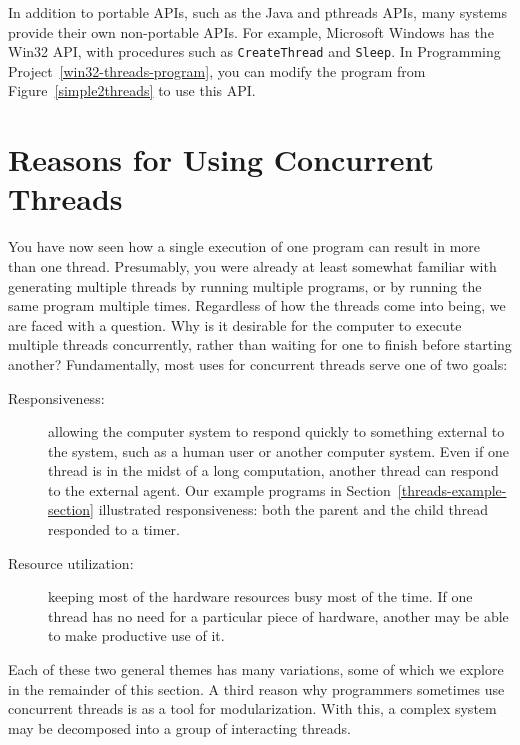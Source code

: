 In addition to portable APIs, such as the Java and pthreads APIs, many
systems provide their own non-portable APIs.  For example, Microsoft
Windows has the Win32 API, with procedures such as \verb|CreateThread|
and \verb|Sleep|.  In Programming Project~\ref{win32-threads-program}, you can modify the
program from Figure~\ref{simple2threads} to use this API.

\section{Reasons for Using Concurrent Threads}\label{threads-uses-section}
You have now seen how a single execution of one program can result in
more than one thread.  Presumably, you were already at least somewhat
familiar with generating multiple threads by running multiple
programs, or by running the same program multiple times.  Regardless
of how the threads come into being, we are faced with a question.  Why
is it desirable for the computer to execute multiple threads
concurrently, rather than waiting for one to finish before starting
another?
Fundamentally, most uses for concurrent threads serve one of two goals:
\begin{description}
\item[Responsiveness:] allowing the computer system to respond quickly
  to something external to the system, such as a human user or another
  computer system.  Even if one thread is in the midst of a long
  computation, another thread can respond to the external agent.  Our
  example programs in Section~\ref{threads-example-section}
  illustrated responsiveness: both the parent and the child thread
  responded to a timer.
\item[Resource utilization:] keeping most of the hardware resources
  busy most of the time.  If one thread has no need for a
  particular piece of hardware, another may be able to make productive
  use of it.
\end{description}
Each of these two general themes has many variations, some of which we
explore in the remainder of this section.  A third reason why
programmers sometimes use concurrent threads is as a tool for
modularization.  With this, a complex system may be decomposed into a group of
interacting threads.

